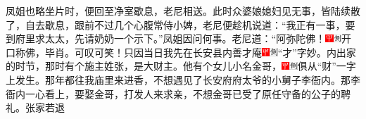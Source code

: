凤姐也略坐片时，便回至净室歇息，老尼相送。此时众婆娘媳妇见无事，皆陆续散了，自去歇息，跟前不过几个心腹常侍小婢，老尼便趁机说道：“我正有一事，要到府里求太太，先请奶奶一个示下。”凤姐因问何事。老尼道：“阿弥陀佛！{\includegraphics[width=3mm]{../Images/00002}\includegraphics[width=3mm]{../Images/00011}\footnotesize \kaishu 开口称佛，毕肖。可叹可笑！}只因当日我先在长安县内善才庵{\includegraphics[width=3mm]{../Images/00002}\includegraphics[width=3mm]{../Images/00011}\footnotesize \kaishu “才”字妙。}内出家的时节，那时有个施主姓张，是大财主。他有个女儿小名金哥，{\includegraphics[width=3mm]{../Images/00002}\includegraphics[width=3mm]{../Images/00011}\footnotesize \kaishu 俱从“财”一字上发生。}那年都往我庙里来进香，不想遇见了长安府府太爷的小舅子李衙内。那李衙内一心看上，要娶金哥，打发人来求亲，不想金哥已受了原任守备的公子的聘礼。张家若退